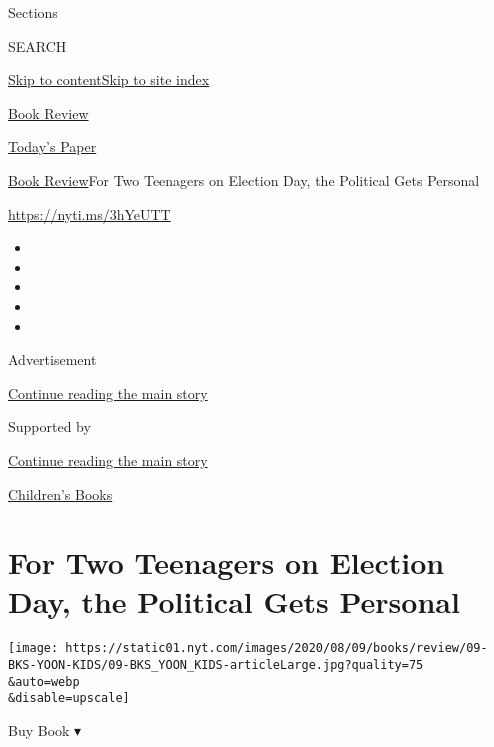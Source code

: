 Sections

SEARCH

\protect\hyperlink{site-content}{Skip to
content}\protect\hyperlink{site-index}{Skip to site index}

\href{https://www.nytimes.com/section/books/review}{Book Review}

\href{https://myaccount.nytimes.com/auth/login?response_type=cookie\&client_id=vi}{}

\href{https://www.nytimes.com/section/todayspaper}{Today's Paper}

\href{/section/books/review}{Book Review}\textbar{}For Two Teenagers on
Election Day, the Political Gets Personal

\url{https://nyti.ms/3hYeUTT}

\begin{itemize}
\item
\item
\item
\item
\item
\end{itemize}

Advertisement

\protect\hyperlink{after-top}{Continue reading the main story}

Supported by

\protect\hyperlink{after-sponsor}{Continue reading the main story}

\href{/column/childrens-books}{Children's Books}

\hypertarget{for-two-teenagers-on-election-day-the-political-gets-personal}{%
\section{For Two Teenagers on Election Day, the Political Gets
Personal}\label{for-two-teenagers-on-election-day-the-political-gets-personal}}

\texttt{[image: https://static01.nyt.com/images/2020/08/09/books/review/09-BKS-YOON-KIDS/09-BKS\_YOON\_KIDS-articleLarge.jpg?quality=75\\\&auto=webp\\\&disable=upscale]}

Buy Book ▾

